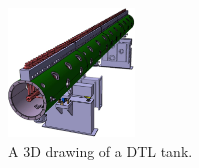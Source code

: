 \begin{figure}
	\begin{center}
		\includegraphics[width=0.3\textwidth]{02_BeamDiag/figures/fig000_DTL_b}
	\end{center}
	\caption[A 3D drawing of a DTL tank]{A 3D drawing of a DTL tank.}
	\label{chap2:fig:DTL}
\end{figure}